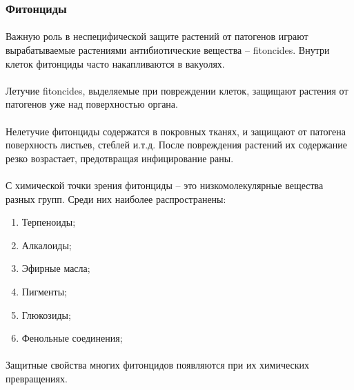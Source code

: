 \subsubsection*{Фитонциды}

\paragraph*{}Важную роль в неспецифической защите растений от патогенов играют вырабатываемые растениями антибиотические вещества -- \gls{fitoncides}. Внутри клеток фитонциды часто накапливаются в вакуолях. 

\paragraph*{}Летучие \gls{fitoncides}, выделяемые при повреждении клеток, защищают растения от патогенов уже над поверхностью органа.  

\paragraph*{}Нелетучие фитонциды содержатся в покровных тканях, и защищают от патогена поверхность листьев, стеблей и.т.д. После повреждения растений их содержание резко возрастает, предотвращая инфицирование раны. 


\paragraph*{}С химической точки зрения фитонциды -- это низкомолекулярные вещества разных групп. Среди них наиболее распространены: 

\begin{enumerate}
\item Терпеноиды;
\item Алкалоиды;
\item Эфирные масла;
\item Пигменты;
\item Глюкозиды;
\item Фенольные соединения;
\end{enumerate}
 
\paragraph*{}Защитные свойства многих фитонцидов появляются при их химических превращениях. 


